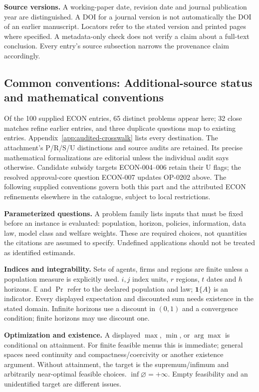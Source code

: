 \documentclass[11pt,a4paper]{article}
\begin{document}
\textbf{Source versions.} A working-paper date, revision date and journal publication year are distinguished. A DOI for a journal version is not automatically the DOI of an earlier manuscript. Locators refer to the stated version and printed pages where specified. A metadata-only check does not verify a claim about a full-text conclusion. Every entry's source subsection narrows the provenance claim accordingly.

\subsection*{Common conventions: Additional-source status and mathematical conventions}

\label{audited:conventions}

Of the 100 supplied ECON entries, 65 distinct problems appear here; 32 close
matches refine earlier entries, and three duplicate questions map to existing
entries. Appendix~\ref{app:audited-crosswalk} lists every destination.
The attachment's P/R/S/U distinctions and source audits are retained. Its
precise mathematical formalizations are editorial unless the individual audit
says otherwise. Candidate subsidy targets ECON-004--006 retain their U flags;
the resolved approval-core question ECON-007 updates OP-0202 above.
The following supplied conventions govern both this part and the attributed
ECON refinements elsewhere in the catalogue, subject to local restrictions.

\textbf{Parameterized questions.} A problem family lists inputs that must be fixed before an instance is evaluated: population, horizon, policies, information, data law, model class and welfare weights. These are required choices, not quantities the citations are assumed to specify. Undefined applications should not be treated as identified estimands.

\textbf{Indices and integrability.} Sets of agents, firms and regions are finite unless a population measure is explicitly used. \(i,j\) index units, \(r\) regions, \(t\) dates and \(h\) horizons. \(\mathbb E\) and \(\Pr\) refer to the declared population and law; \(\mathbf1\{A\}\) is an indicator. Every displayed expectation and discounted sum needs existence in the stated domain. Infinite horizons use a discount in \((0,1)\) and a convergence condition; finite horizons may use discount one.

\textbf{Optimization and existence.} A displayed \(\max\), \(\min\), or \(\arg\max\) is conditional on attainment. For finite feasible menus this is immediate; general spaces need continuity and compactness/coercivity or another existence argument. Without attainment, the target is the supremum/infimum and arbitrarily near-optimal feasible choices. \(\inf\varnothing=+\infty\). Empty feasibility and an unidentified target are different issues.
\end{document}
